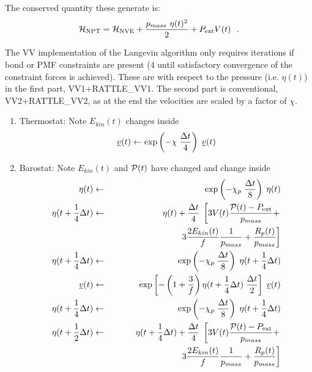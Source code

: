 The conserved quantity these generate is:
\begin{equation}
{\cal H}_{\rm NPT} = {\cal H}_{\rm NVE} + {p_{mass}~\eta (t)^{2} \over 2} + P_{\rm ext} V(t)~~.
\end{equation}

The VV implementation of the Langevin algorithm only requires iterations
if bond or PMF constraints are present ($4$ until satisfactory
convergence of the constraint forces is achieved).  These are
with respect to the pressure (i.e. $\eta (t)$) in the first part,
VV1+RATTLE\_VV1.  The second part is conventional, VV2+RATTLE\_VV2,
as at the end the velocities are scaled by a factor of $\chi$.
\begin{enumerate}
\item Thermostat: Note $E_{kin}(t)$ changes inside
\begin{equation}
\mbox{$\underline{v}$}(t) \leftarrow \exp \left( -\chi \; {\Delta t \over 4} \right) \; \mbox{$\underline{v}$}(t)
\end{equation}
\item Barostat: Note $E_{kin}(t)$ and ${\cal P}(t)$ have changed and change inside
\begin{eqnarray}
\eta (t) &\leftarrow& \exp \left( -\chi_{p} \; {\Delta t \over 8} \right) \;
\eta (t)\nonumber \\
\eta (t + {1 \over 4} \Delta t) &\leftarrow& \eta (t) + {\Delta t \over 4} \;
\left[ 3 V(t) \frac{{\cal P}(t) - P_{\rm ext}}{p_{mass}} + \right. \nonumber \\
&& ~~~~~~~~~~~~~~~~~~~~~~~~\left. 3 \frac{2 E_{kin}(t)}{f} \frac{1}{p_{mass}} + \frac{R_{p}(t)}{p_{mass}} \right] \nonumber \\
\eta (t + {1 \over 4} \Delta t) &\leftarrow& \exp \left( -\chi_{p} \; {\Delta t \over 8} \right)  \;
\eta (t + {1 \over 4} \Delta t) \nonumber \\
\vek{v}(t) &\leftarrow& \exp \left[ -\left( 1 + \frac{3}{f} \right)
\eta (t + {1 \over 4}\Delta t) \; {\Delta t \over 2} \right] \; \vek{v}(t) \\
\eta (t + {1 \over 4} \Delta t) &\leftarrow& \exp \left( -\chi_{p} \; {\Delta t \over 8} \right)  \;
\eta (t + {1 \over 4} \Delta t) \nonumber \\
\eta (t + {1 \over 2} \Delta t) &\leftarrow& \eta (t + {1 \over 4} \Delta t) + {\Delta t \over 4} \;
\left[ 3 V(t) \frac{{\cal P}(t) - P_{\rm ext}}{p_{mass}} + \right. \nonumber \\
&& ~~~~~~~~~~~~~~~~~~~~~~~~\left. 3 \frac{2 E_{kin}(t)}{f} \frac{1}{p_{mass}} + \frac{R_{p}(t)}{p_{mass}} \right] \nonumber \\

\end{eqnarray}
\end{enumerate}
